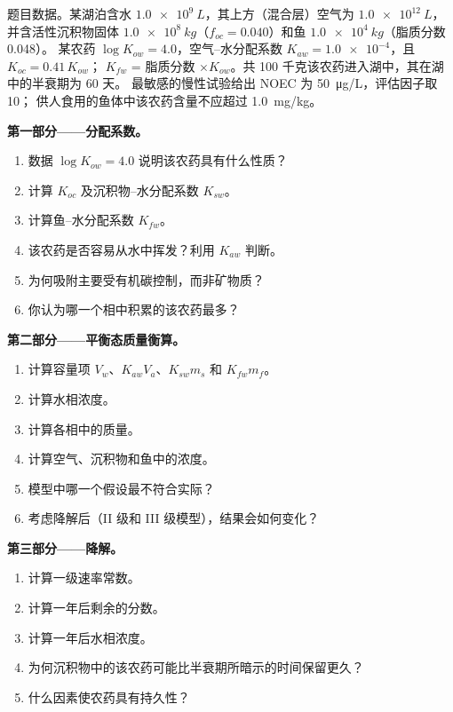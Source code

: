 \begin{problem}
\label{pb:b3:environmental-toxicology:1}
题目数据。某湖泊含水 $\qty{1.0e9}{L}$，其上方（混合层）空气为 $\qty{1.0e12}{L}$，
并含活性沉积物固体 $\qty{1.0e8}{kg}$（$f_{oc} = 0.040$）和鱼 $\qty{1.0e4}{kg}$（脂质分数 0.048）。
某农药 $\log K_{ow} = 4.0$，空气–水分配系数 $K_{aw} = \num{1.0e-4}$，且 $K_{oc} = 0.41\,K_{ow}$；
$K_{fw}$ = 脂质分数 $\times K_{ow}$。共 100 千克该农药进入湖中，其在湖中的半衰期为 60 天。
最敏感的慢性试验给出 NOEC 为 \qty{50}{\micro g/L}，评估因子取 10；
供人食用的鱼体中该农药含量不应超过 \qty{1.0}{mg/kg}。

\medskip\noindent\textbf{第一部分——分配系数。}
\begin{enumerate}
  \item 数据 $\log K_{ow} = 4.0$ 说明该农药具有什么性质？
  \item 计算 $K_{oc}$ 及沉积物–水分配系数 $K_{sw}$。
  \item 计算鱼–水分配系数 $K_{fw}$。
  \item 该农药是否容易从水中挥发？利用 $K_{aw}$ 判断。
  \item 为何吸附主要受有机碳控制，而非矿物质？
  \item 你认为哪一个相中积累的该农药最多？
\end{enumerate}

\medskip\noindent\textbf{第二部分——平衡态质量衡算。}
\begin{enumerate}[resume]
  \item 计算容量项 $V_w$、$K_{aw}V_a$、$K_{sw}m_s$ 和 $K_{fw}m_f$。
  \item 计算水相浓度。
  \item 计算各相中的质量。
  \item 计算空气、沉积物和鱼中的浓度。
  \item 模型中哪一个假设最不符合实际？
  \item 考虑降解后（II 级和 III 级模型），结果会如何变化？
\end{enumerate}

\medskip\noindent\textbf{第三部分——降解。}
\begin{enumerate}[resume]
  \item 计算一级速率常数。
  \item 计算一年后剩余的分数。
  \item 计算一年后水相浓度。
  \item 为何沉积物中的该农药可能比半衰期所暗示的时间保留更久？
  \item 什么因素使农药具有持久性？
\end{enumerate}


\end{problem}
